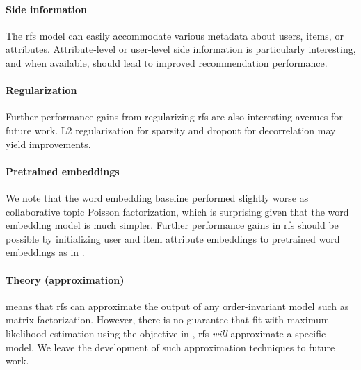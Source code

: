 \paragraph{Side information} The \gls{rfs} model can easily accommodate various
metadata about users, items, or attributes. Attribute-level or user-level side
information is particularly interesting, and when available, should lead to
improved recommendation performance.

\paragraph{Regularization} Further performance gains from regularizing \gls{rfs}
are also interesting avenues for future work. L2 regularization for sparsity and
dropout for decorrelation may yield improvements.

\paragraph{Pretrained embeddings} We note that the word embedding baseline
performed slightly worse as collaborative topic Poisson factorization, which is
surprising given that the word embedding model is much simpler. Further
performance gains in \gls{rfs} should be possible by initializing user and item
attribute embeddings to pretrained word embeddings as in \citet{chen2017joint}.

\paragraph{Theory (approximation)}  means
that \gls{rfs} can approximate the output of any order-invariant model
such as matrix factorization. However, there is no guarantee that fit with
maximum likelihood estimation using the objective in ,
\gls{rfs} \emph{will} approximate a specific model. We leave the development of
such approximation techniques to future work.

